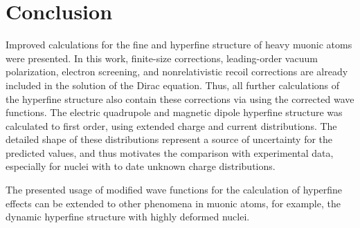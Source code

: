 \section{Conclusion}
Improved calculations for the fine and hyperfine structure of heavy muonic atoms were presented. In this work, finite-size corrections, leading-order vacuum polarization, electron screening, and nonrelativistic recoil corrections are already included in the solution of the Dirac equation. Thus, all further calculations of the hyperfine structure also contain these corrections via using the corrected wave functions. The electric quadrupole and magnetic dipole hyperfine structure was calculated to first order, using extended charge and current distributions. The detailed shape of these distributions represent a source of uncertainty for the predicted values, and thus motivates the comparison with experimental data, especially for nuclei with to date unknown charge distributions.

The presented usage of modified wave functions for the calculation of hyperfine effects can be extended to other phenomena in muonic atoms, for example, the dynamic hyperfine structure with highly deformed nuclei.






